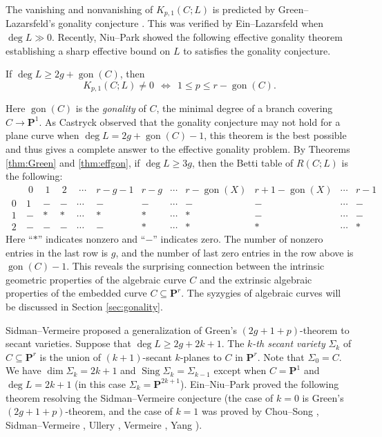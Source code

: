 \documentclass[graybox]{svmult}
\newcommand{\kk}{\mathbf{k}}
\def\nP{\mathbf{P}}
\def\Sing{\operatorname{Sing}}
\DeclareMathOperator{\gon}{gon}
\begin{document}
\noindent The vanishing and nonvanishing of $K_{p,1}(C;L)$ is predicted by Green--Lazarsfeld's gonality conjecture \cite[Conjecture 3.7]{GL1}. This was verified by Ein--Lazarsfeld \cite{EL2} when $\deg L \gg 0$. Recently, Niu--Park \cite{NP} showed the following effective gonality theorem establishing a sharp effective bound on $L$ to satisfies the gonality conjecture.

\begin{theorem}[{$\operatorname{char}(\kk)=0$}]\label{thm:effgon}
If $\deg L \geq 2g+\gon(C)$, then 
$$
K_{p,1}(C; L) \neq 0 ~~\Longleftrightarrow~~ 1 \leq p \leq r-\gon(C).
$$
\end{theorem}

\noindent Here $\gon(C)$ is the \emph{gonality} of $C$, the minimal degree of a branch covering $C \to \nP^1$. As Castryck \cite{Castryck} observed that the gonality conjecture may not hold for a plane curve when $\deg L = 2g+\gon(C)-1$, this theorem is the best possible and thus gives a complete answer to the effective gonality problem. By Theorems \ref{thm:Green} and \ref{thm:effgon}, if $\deg L \geq 3g$, then the Betti table of $R(C;L)$ is the following:
$$
\begin{array}{c|ccccccccccc}
& ~0~ & ~1~ & ~2~ & ~\cdots~ & r-g-1 & r-g & \cdots & r-\gon(X) & r+1-\gon(X) & \cdots &   r-1 \\ \hline
~0~ &1 & - & - & \cdots & - & - & \cdots & - & - & \cdots & -\\
~1~ & - & * & * & \cdots & * & * & \cdots & * & - & \cdots & - \\
~2~ & - & - & - & \cdots & - & * & \cdots & * & * & \cdots & *
\end{array}
$$
Here ``$*$'' indicates nonzero and ``$-$'' indicates zero. The number of nonzero entries in the last row is $g$, and the number of last zero entries in the row above is $\gon(C)-1$. This reveals the surprising connection between the intrinsic geometric properties of the algebraic curve $C$ and the extrinsic algebraic properties of the embedded curve $C \subseteq \nP^r$. The syzygies of algebraic curves will be discussed in Section \ref{sec:gonality}. 

Sidman--Vermeire \cite{SV} proposed a generalization of Green's $(2g+1+p)$-theorem to secant varieties. Suppose that $\deg L \geq 2g+2k+1$. The \emph{$k$-th secant variety} $\Sigma_k$ of $C \subseteq \nP^r$ is the union of $(k+1)$-secant $k$-planes to $C$ in $\nP^r$. Note that $\Sigma_0=C$. We have $\dim \Sigma_k = 2k+1$ and $\Sing \Sigma_k = \Sigma_{k-1}$ except when $C=\nP^1$ and $\deg L = 2k+1$ (in this case $\Sigma_k= \nP^{2k+1}$).  Ein--Niu--Park \cite{ENP1} proved the following theorem resolving the Sidman--Vermeire conjecture \cite[Conjecture 1.3]{SV} (the case of $k=0$ is Green's $(2g+1+p)$-theorem, and the case of $k=1$ was proved by Chou--Song \cite{CS}, Sidman--Vermeire \cite{SV}, Ullery \cite{Ullery}, Vermeire \cite{Vermeire}, Yang \cite{RuijieYang}).
\end{document}
